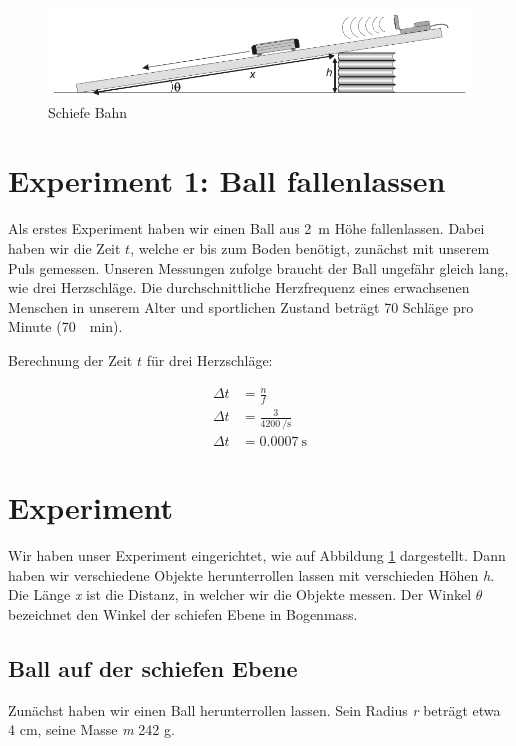 \documentclass[a4paper, titlepage]{article}
\begin{document}
    \begin{figure}
        \includegraphics[width=\textwidth]{images/incline.png}
        \caption{Schiefe Bahn}
        \label{incline}
    \end{figure}

    \section{Experiment 1: Ball fallenlassen}
    Als erstes Experiment haben wir einen Ball aus \SI{2}{\metre} Höhe
    fallenlassen. Dabei haben wir die Zeit $t$, welche er bis zum Boden
    benötigt, zunächst mit unserem Puls gemessen. Unseren Messungen zufolge
    braucht der Ball ungefähr gleich lang, wie drei Herzschläge. Die
    durchschnittliche Herzfrequenz eines erwachsenen Menschen in unserem
    Alter und sportlichen Zustand beträgt 70 Schläge pro Minute (\SI{70}{\per\minute}).

    Berechnung der Zeit $t$ für drei Herzschläge:

    \begin{align}
        \Delta t &= \frac{n}{f} \\
        \Delta t &= \frac{3}{\SI{4200}{\per\second}} \\
        \Delta t &= \SI{0.0007}{\second}
    \end{align}






    \section{Experiment}
    Wir haben unser Experiment eingerichtet, wie auf Abbildung
    \ref{incline} dargestellt. Dann haben wir verschiedene Objekte
    herunterrollen lassen mit verschieden Höhen
    \emph{h}. Die Länge \emph{x} ist die Distanz, in welcher
    wir die Objekte messen. Der Winkel $\theta$ bezeichnet
    den Winkel der schiefen Ebene in Bogenmass.

    \subsection{Ball auf der schiefen Ebene}
    Zunächst haben wir einen Ball herunterrollen lassen.
    Sein Radius \emph{r} beträgt etwa 4 cm, seine Masse
    \emph{m} 242 g.
    
\end{document}
